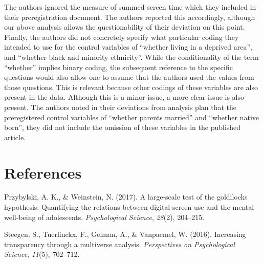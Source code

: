 \documentclass[man]{apa6}
\theoremstyle{definition}
\theoremstyle{definition}
\theoremstyle{definition}
\theoremstyle{remark}
\begin{document}
The authors ignored the measure of summed screen time which they
included in their preregistration document. The authors reported this
accordingly, although our above analysis allows the questionability of
their deviation on this point. Finally, the authors did not concretely
specify what particular coding they intended to use for the control
variables of \enquote{whether living in a deprived area}, and
\enquote{whether black and minority ethnicity}. While the conditionality
of the term \enquote{whether} implies binary coding, the subsequent
reference to the specific questions would also allow one to assume that
the authors used the values from those questions. This is relevant
because other codings of these variables are also present in the data.
Although this is a minor issue, a more clear issue is also present. The
authors noted in their deviations from analysis plan that the
preregistered control variables of \enquote{whether parents married} and
\enquote{whether native born}, they did not include the omission of
these variables in the published article.

\newpage

\hypertarget{references}{%
\section{References}\label{references}}

\begingroup
\setlength{\parindent}{-0.5in}
\setlength{\leftskip}{0.5in}

\hypertarget{refs}{}
\leavevmode\hypertarget{ref-przybylski2017large}{}%
Przybylski, A. K., \& Weinstein, N. (2017). A large-scale test of the
goldilocks hypothesis: Quantifying the relations between digital-screen
use and the mental well-being of adolescents. \emph{Psychological
Science}, \emph{28}(2), 204--215.

\leavevmode\hypertarget{ref-steegen2016increasing}{}%
Steegen, S., Tuerlinckx, F., Gelman, A., \& Vanpaemel, W. (2016).
Increasing transparency through a multiverse analysis.
\emph{Perspectives on Psychological Science}, \emph{11}(5), 702--712.

\endgroup
\end{document}
